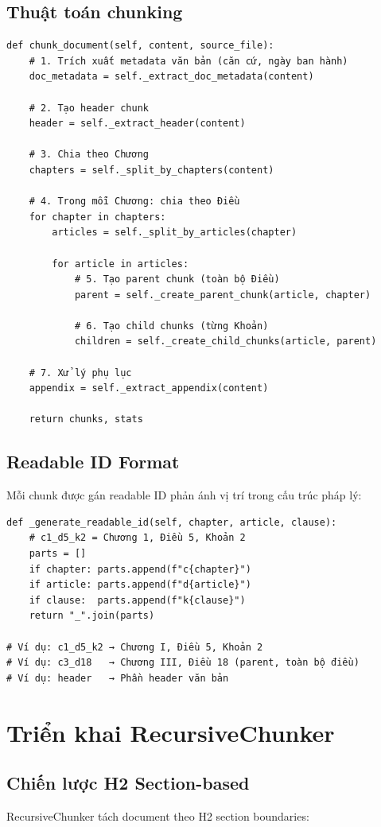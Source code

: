 \documentclass[../DoAn.tex]{subfiles}
\begin{document}
\subsection{Thuật toán chunking}
\begin{verbatim}
def chunk_document(self, content, source_file):
    # 1. Trích xuất metadata văn bản (căn cứ, ngày ban hành)
    doc_metadata = self._extract_doc_metadata(content)
    
    # 2. Tạo header chunk
    header = self._extract_header(content)
    
    # 3. Chia theo Chương
    chapters = self._split_by_chapters(content)
    
    # 4. Trong mỗi Chương: chia theo Điều
    for chapter in chapters:
        articles = self._split_by_articles(chapter)
        
        for article in articles:
            # 5. Tạo parent chunk (toàn bộ Điều)
            parent = self._create_parent_chunk(article, chapter)
            
            # 6. Tạo child chunks (từng Khoản)
            children = self._create_child_chunks(article, parent)
    
    # 7. Xử lý phụ lục
    appendix = self._extract_appendix(content)
    
    return chunks, stats
\end{verbatim}

\subsection{Readable ID Format}
Mỗi chunk được gán readable ID phản ánh vị trí trong cấu trúc pháp lý:
\begin{verbatim}
def _generate_readable_id(self, chapter, article, clause):
    # c1_d5_k2 = Chương 1, Điều 5, Khoản 2
    parts = []
    if chapter: parts.append(f"c{chapter}")
    if article: parts.append(f"d{article}")
    if clause:  parts.append(f"k{clause}")
    return "_".join(parts)
    
# Ví dụ: c1_d5_k2 → Chương I, Điều 5, Khoản 2
# Ví dụ: c3_d18   → Chương III, Điều 18 (parent, toàn bộ điều)
# Ví dụ: header   → Phần header văn bản
\end{verbatim}

\section{Triển khai RecursiveChunker}

\subsection{Chiến lược H2 Section-based}
RecursiveChunker tách document theo H2 section boundaries:
\end{document}
